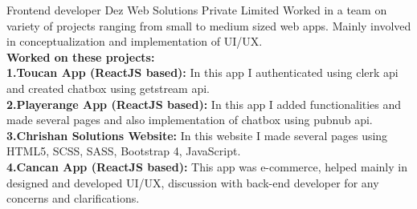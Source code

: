     {Frontend developer}
    {}
    {Dez Web Solutions Private Limited}
    {}
    {Worked in a team on variety of projects ranging from small to medium sized web apps. Mainly involved in conceptualization and implementation of UI/UX.
    \\ \textbf{Worked on these projects:}
    \\ \textbf{1.Toucan App (ReactJS based):} In this app I authenticated using clerk api and created chatbox using getstream api.
    \\ \textbf{2.Playerange App (ReactJS based):} In this app I added functionalities and made several pages and also implementation of chatbox using pubnub api.
    \\ \textbf{3.Chrishan Solutions Website:} In this website I made several pages using HTML5, SCSS, SASS, Bootstrap 4, JavaScript.
    \\ \textbf{4.Cancan App (ReactJS based):} This app was e-commerce, helped mainly in designed and developed UI/UX, discussion with back-end developer for any concerns and clarifications.
    }
    
    
    \vspace*{0.2\baselineskip}

